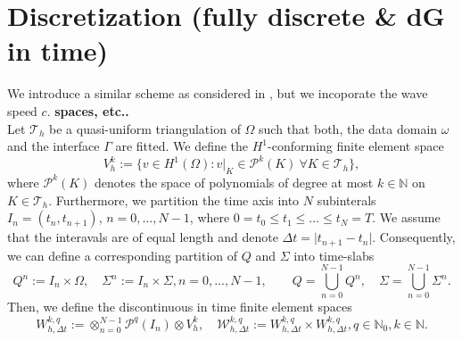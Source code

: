 \documentclass[10pt,reqno]{amsart}
\numberwithin{equation}{section}
\newcommand{\FullyDiscrSpace}[2]{ W^{ {#1},{#2}}_{h, \Delta t  } }
\newcommand{\ProdFullyDiscrSpace}[2]{ \mathcal{W}^{ {#1},{#2}}_{h, \Delta t  } }
\begin{document}
\section{Discretization (fully discrete \& dG in time)} 
\noindent We introduce a similar scheme as considered in \cite{BP24}, but we incoporate the wave speed $c$. \textbf{spaces, etc..} \\
Let $\mathcal{T}_h$ be a quasi-uniform triangulation of $\Omega$ such that both, the data domain $\omega$ and the interface $\Gamma$ are fitted. We define the $H^1$-conforming finite element space 
\begin{equation}
    V_h^k := \{ v \in H^1(\Omega) : v \vert_{K} \in \mathcal{P}^k(K) \ \forall K \in \mathcal{T}_h \},
\end{equation}
where $\mathcal{P}^k(K)$ denotes the space of polynomials of degree at most $k \in \mathbb{N}$ on $K \in \mathcal{T}_h$. Furthermore, we partition the time axis into $N$ subinterals $I_n = (t_n,t_{n+1})$, $n = 0, \dots, N-1$, where $0 = t_0 \le t_1 \le \dots \le t_N = T$. We assume that the interavals are of equal length and denote $\Delta t = \vert t_{n+1} -t_n \vert$. Consequently, we can define a corresponding partition of $Q$ and $\Sigma$ into time-slabs 
\begin{equation}
    Q^n := I_n \times \Omega, \quad \Sigma^n := I_n \times \Sigma, n = 0, \dots, N-1, \qquad Q = \bigcup_{n = 0}^{N-1} Q^n, \quad \Sigma = \bigcup_{n = 0}^{N-1} \Sigma^n.
\end{equation}
Then, we define the discontinuous in time finite element spaces 
\begin{equation}
    \FullyDiscrSpace{k}{q} := \otimes_{n = 0}^{N-1} \mathcal{P}^q(I_n) \otimes V_h^k, \quad \ProdFullyDiscrSpace{k}{q} :=  \FullyDiscrSpace{k}{q} \times \FullyDiscrSpace{k}{q}, q \in \mathbb{N}_0, k \in \mathbb{N}. 
\end{equation}
\end{document}
